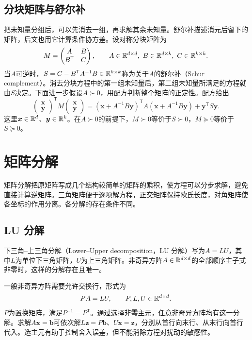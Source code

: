 \subsection{分块矩阵与舒尔补}
把未知量分组后，可以先消去一组，再求解其余未知量。舒尔补描述消元后留下的矩阵，后文也用它计算条件协方差。设对称分块矩阵为
\begin{equation}
 M=\begin{pmatrix}A&B\\B^{\mathsf T}&C\end{pmatrix},\qquad
 A\in\mathbb{R}^{d\times d},\ B\in\mathbb{R}^{d\times k},\ C\in\mathbb{R}^{k\times k}.
\end{equation}
当$A$可逆时，$S=C-B^{\mathsf T}A^{-1}B\in\mathbb{R}^{k\times k}$称为关于$A$的舒尔补（Schur complement）。消去分块方程中的第一组未知量后，第二组未知量所满足的方程就由$S$决定。下面进一步假设$A\succ0$，用配方判断整个矩阵的正定性。配方给出
\begin{equation}
 \begin{pmatrix}\bm x\\\bm y\end{pmatrix}^{\mathsf T}M
 \begin{pmatrix}\bm x\\\bm y\end{pmatrix}
 =(\bm x+A^{-1}B\bm y)^{\mathsf T}A(\bm x+A^{-1}B\bm y)+\bm y^{\mathsf T}S\bm y.
\end{equation}
这里$\bm x\in\mathbb{R}^d$、$\bm y\in\mathbb{R}^k$。在$A\succ0$的前提下，$M\succ0$等价于$S\succ0$，$M\succeq0$等价于$S\succeq0$。

\section{矩阵分解}
矩阵分解把原矩阵写成几个结构较简单的矩阵的乘积，使方程可以分步求解，避免直接计算逆矩阵。三角矩阵便于逐项解方程，正交矩阵保持欧氏长度，对角矩阵使各坐标的作用分离。各分解的存在条件不同。

\subsection{LU 分解}
下三角--上三角分解（Lower--Upper decomposition，LU 分解）写为$A=LU$，其中$L$为单位下三角矩阵，$U$为上三角矩阵。非奇异方阵$A\in\mathbb{R}^{d\times d}$的全部顺序主子式非零时，这样的分解存在且唯一。

一般非奇异方阵需要允许交换行，形式为
\begin{equation}
 PA=LU,\qquad P,L,U\in\mathbb{R}^{d\times d}.
\end{equation}
$P$为置换矩阵，满足$P^{-1}=P^{\mathsf T}$。通过选择非零主元，任意非奇异方阵均有这一分解。求解$A\bm x=\bm b$可依次解$L\bm z=P\bm b$、$U\bm x=\bm z$，分别从首行向末行、从末行向首行代入。选主元有助于控制舍入误差，但不能消除方程对扰动的敏感性。

